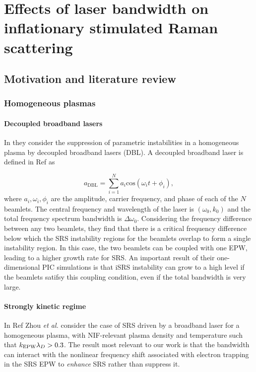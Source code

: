 \chapter{Effects of laser bandwidth on inflationary stimulated Raman scattering}
\label{chp:broadbandSRS}

\section{Motivation and literature review}

\subsection{Homogeneous plasmas}
\subsubsection{Decoupled broadband lasers}
In \cite{zhao_suppression_2019} they consider the suppression of parametric
instabilities in a homogeneous plasma by decoupled broadband lasers
(\acrshort{DBL}). A
decoupled broadband laser is defined in Ref \cite{zhao_effective_2017} as

\begin{equation}\label{eqn:DBL}
  a_{\mathrm{DBL}} = \sum_{i=1}^{N} a_i \mathrm{cos}(\omega_it + \phi_i),
\end{equation}
where $a_i,\omega_i,\phi_i$ are the amplitude, carrier frequency, and phase of
each of the $N$ beamlets. The central frequency and wavelength of the laser is
$(\omega_0,k_0)$ and the total frequency spectrum bandwidth is
$\Delta\omega_0$.
Considering the frequency difference between any two beamlets, they find that
there is a critical frequency difference below which the SRS instability regions
for the beamlets overlap to form a single instability region. In this case, the
two beamlets can be coupled with one EPW, leading to a higher growth rate for
SRS. An important result of their one-dimensional PIC simulations is that iSRS
instability can grow to a high level if the beamlets satifsy this coupling
condition, even if the total bandwidth is very large.

\subsubsection{Strongly kinetic regime}
In Ref \cite{zhou_kinetic_2018} Zhou \textit{et al.} consider the case of SRS
driven by a broadband laser for a homogeneous plasma, with NIF-relevant plasma
density and temperature such that $k_\mathrm{EPW}\lambda_D > 0.3$. The result most relevant to our
work is that the bandwidth can interact with the nonlinear frequency shift associated with electron trapping in the SRS EPW to \emph{enhance} SRS rather than suppress it.


